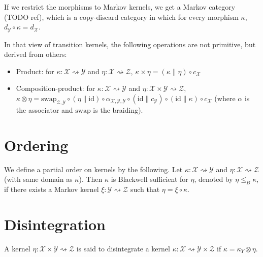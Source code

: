 If we restrict the morphisms to Markov kernels, we get a Markov category (TODO ref), which is a copy-discard category in which for every morphism $\kappa$, $d_{\mathcal Y} \circ \kappa = d_{\mathcal X}$.

In that view of transition kernels, the following operations are not primitive, but derived from others:
\begin{itemize}
  \item Product: for $\kappa : \mathcal X \rightsquigarrow \mathcal Y$ and $\eta : \mathcal X \rightsquigarrow \mathcal Z$, $\kappa \times \eta = (\kappa \parallel \eta) \circ c_{\mathcal X}$
  \item Composition-product: for $\kappa : \mathcal X \rightsquigarrow \mathcal Y$ and $\eta : \mathcal X \times \mathcal Y \rightsquigarrow \mathcal Z$, $\kappa \otimes \eta = \mathrm{swap_{\mathcal Z, \mathcal Y}} \circ (\eta \parallel \mathrm{id}) \circ \alpha_{\mathcal X, \mathcal Y, \mathcal Y} \circ (\mathrm{id} \parallel c_{\mathcal Y}) \circ (\mathrm{id} \parallel \kappa) \circ c_{\mathcal X}$ (where $\alpha$ is the associator and $\mathrm{swap}$ is the braiding).
\end{itemize}



\section{Ordering}

\begin{definition}
  \label{def:blackwellOrder}
  We define a partial order on kernels by the following. Let $\kappa : \mathcal X \rightsquigarrow \mathcal Y$ and $\eta : \mathcal X \rightsquigarrow \mathcal Z$ (with same domain as $\kappa$).
  Then $\kappa$ is Blackwell sufficient for $\eta$, denoted by $\eta \le_B \kappa$, if there exists a Markov kernel $\xi : \mathcal Y \rightsquigarrow \mathcal Z$ such that $\eta = \xi \circ \kappa$.
\end{definition}



\section{Disintegration}

A kernel $\eta : \mathcal X \times \mathcal Y \rightsquigarrow \mathcal Z$ is said to disintegrate a kernel $\kappa : \mathcal X \rightsquigarrow \mathcal Y \times \mathcal Z$ if $\kappa = \kappa_{Y} \otimes \eta$.

